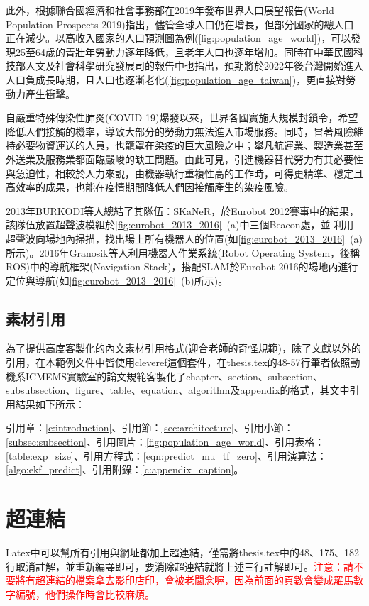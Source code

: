 此外，根據聯合國經濟和社會事務部在2019年發布世界人口展望報告(World Population Prospects 2019)\cite{nations2019world}指出，儘管全球人口仍在增長，但部分國家的總人口正在減少。以高收入國家的人口預測圖為例(\cref{fig:population_age_world})，可以發現25至64歲的青壯年勞動力逐年降低，且老年人口也逐年增加。同時在中華民國科技部人文及社會科學研究發展司的報告中也指出\cite{人文與社科簡訊_人口老化}，預期將於2022年後台灣開始進入人口負成長時期，且人口也逐漸老化(\cref{fig:population_age_taiwan})，更直接對勞動力產生衝擊。

自嚴重特殊傳染性肺炎(COVID-19)爆發以來，世界各國實施大規模封鎖令，希望降低人們接觸的機率，導致大部分的勞動力無法進入市場服務。同時，冒著風險維持必要物資運送的人員，也籠罩在染疫的巨大風險之中；舉凡航運業、製造業甚至外送業及服務業都面臨嚴峻的缺工問題。由此可見，引進機器替代勞力有其必要性與急迫性，相較於人力來說，由機器執行重複性高的工作時，可得更精準、穩定且高效率的成果，也能在疫情期間降低人們因接觸產生的染疫風險。

2013年BURKODI等人\cite{eurobot_ultrasound_2013}總結了其隊伍：SKaNeR，於Eurobot 2012賽事中的結果，該隊伍放置超聲波模組於\cref{fig:eurobot_2013_2016}~(a)中三個Beacon處，並
利用超聲波向場地內掃描，找出場上所有機器人的位置(如\cref{fig:eurobot_2013_2016}~(a)所示)。2016年Granosik等人\cite{eurobot_ros_2016}利用機器人作業系統(Robot Operating System，後稱ROS)\cite{ros_2009}中的導航框架(Navigation Stack)，搭配SLAM於Eurobot 2016的場地內進行定位與導航(如\cref{fig:eurobot_2013_2016}~(b)所示)。


\subsection{素材引用}

為了提供高度客製化的內文素材引用格式(迎合老師的奇怪規範)，除了文獻以外的引用，在本範例文件中皆使用cleveref這個套件，在thesis.tex的48-57行筆者依照動機系ICMEMS實驗室的論文規範客製化了chapter、section、subsection、subsubsection、figure、table、equation、algorithm及appendix的格式，其文中引用結果如下所示：

引用章：\cref{c:introduction}、引用節：\cref{sec:architecture}、引用小節：\cref{subsec:subsection}、引用圖片：\cref{fig:population_age_world}、引用表格：\cref{table:exp_size}、引用方程式：\cref{eqn:predict_mu_tf_zero}、引用演算法：\cref{algo:ekf_predict}、引用附錄：\cref{c:appendix_caption}。

\section{超連結}

Latex中可以幫所有引用與網址都加上超連結，僅需將thesis.tex中的48、175、182行取消註解，並重新編譯即可，要消除超連結就將上述三行註解即可。\textcolor{red}{注意：請不要將有超連結的檔案拿去影印店印，會被老闆念喔，因為前面的頁數會變成羅馬數字編號，他們操作時會比較麻煩。}